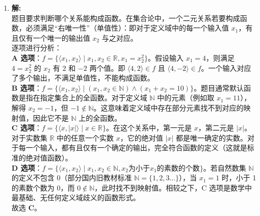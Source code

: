 \begin{enumerate}
	\item \textbf{解:}\\
	题目要求判断哪个关系能构成函数。在集合论中，一个二元关系若要构成函数，必须满足“右唯一性”（单值性）：即对于定义域中的每一个输入值 $x_1$，有且仅有一个唯一的输出值 $x_2$ 与之对应。\\
	逐项进行分析：\\
	\textbf{A 选项}：$f = \{\langle x_1, x_2 \rangle \mid x_1, x_2 \in \mathbb{R}, x_1 = x_2^2\}$。假设输入 $x_1 = 4$，则满足 $4 = x_2^2$ 的 $x_2$ 有 $2$ 和 $-2$ 两个值。即 $\langle 4, 2 \rangle \in f$ 且 $\langle 4, -2 \rangle \in f$。一个输入对应了多个输出，不满足单值性，不能构成函数。\\
	\textbf{B 选项}：$f = \{\langle x_1, x_2 \rangle \mid (x_1, x_2 \in \mathbb{N}) \land (x_1 + x_2 = 10)\}$。题目通常默认函数是指在指定集合上的全函数。对于定义域 $\mathbb{N}$ 中的元素（例如取 $x_1 = 11$），解得 $x_2 = -1$，但 $-1 \notin \mathbb{N}$。这意味着定义域中存在部分元素找不到对应的映射值，因此它不是 $\mathbb{N}$ 上的全函数。\\
	\textbf{C 选项}：$f = \{\langle x, |x| \rangle \mid x \in \mathbb{R}\}$。在这个关系中，第一元是 $x$，第二元是 $|x|$。对于实数集 $\mathbb{R}$ 中的任意一个实数 $x$，它的绝对值 $|x|$ 都是唯一确定的实数。对于每一个输入，都有且仅有一个确定的输出，完全符合函数的定义（这就是标准的绝对值函数）。\\
	\textbf{D 选项}：$f = \{\langle x_1, x_2 \rangle \mid x_1, x_2 \in \mathbb{N}, x_2 \text{为小于} x_1 \text{的素数的个数}\}$。若自然数集 $\mathbb{N}$ 的定义不包含 $0$（部分国内旧教材标准 $\mathbb{N}=\{1,2,3...\}$），当 $x_1=1$ 时，小于 1 的素数个数为 0，而 $0 \notin \mathbb{N}$，此时找不到映射值。相较之下，C 选项是数学中最基础、无任何定义域歧义的函数形式。\\
	故选 \textbf{C}。
	
	\vspace{1em}
	

\end{enumerate}
